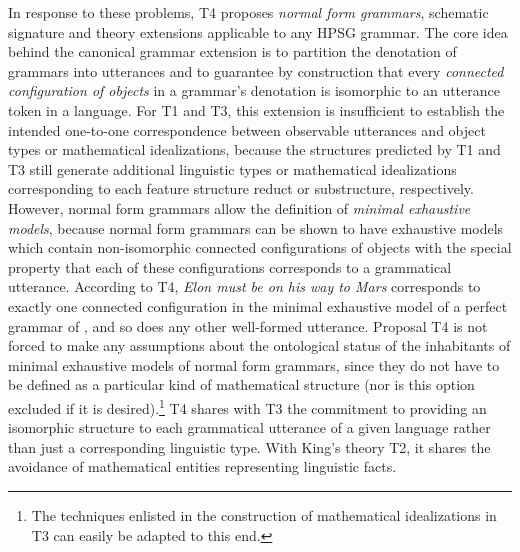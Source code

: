 \documentclass[output=paper,biblatex,babelshorthands,newtxmath,draftmode,colorlinks,citecolor=brown]{langscibook}
\begin{document}
{\largerpage
In response to these problems, T4 proposes \emph{normal form
  grammars}, schematic signature and theory extensions applicable to
any HPSG grammar. The core idea behind the canonical grammar extension
is to partition the denotation of grammars into utterances and to
guarantee by construction that every \emph{connected configuration of
  objects} in a grammar's denotation is isomorphic to an utterance
token in a language. For T1 and T3, this extension is insufficient to
establish the intended one-to-one correspondence between observable
utterances and object types or mathematical idealizations, because the
structures predicted by T1 and T3 still generate additional linguistic
types or mathematical idealizations corresponding to each feature
structure reduct or substructure, respectively. However, normal form
grammars allow the definition of \emph{minimal exhaustive models},
because normal form grammars can be shown to have exhaustive models
which contain non-isomorphic connected configurations of objects with
the special property that each of these configurations corresponds to
a grammatical utterance. According to T4, \emph{Elon must be on his way
  to Mars} corresponds to exactly one connected configuration in the
minimal exhaustive model of a perfect grammar of , and so does
any other well-formed  utterance. Proposal T4
is not forced to make any assumptions about the ontological status of
the inhabitants of minimal exhaustive models of normal form grammars,
since they do not have to be defined as a particular kind of
mathematical structure (nor is this option excluded if it is
desired).\footnote{The techniques enlisted in the construction of
mathematical idealizations in T3 can easily be adapted to this end.} T4 shares with T3 the commitment to providing an isomorphic
structure to each grammatical utterance of a given language rather
than just a corresponding linguistic type. With King's theory T2, it
shares the avoidance of mathematical entities representing linguistic
facts.

}
\end{document}
